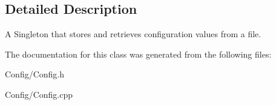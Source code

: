 \subsection{\-Detailed \-Description}
\-A \-Singleton that stores and retrieves configuration values from a file. 

\-The documentation for this class was generated from the following files\-:\begin{DoxyCompactItemize}
\item 
\-Config/\-Config.\-h\item 
\-Config/\-Config.\-cpp\end{DoxyCompactItemize}
